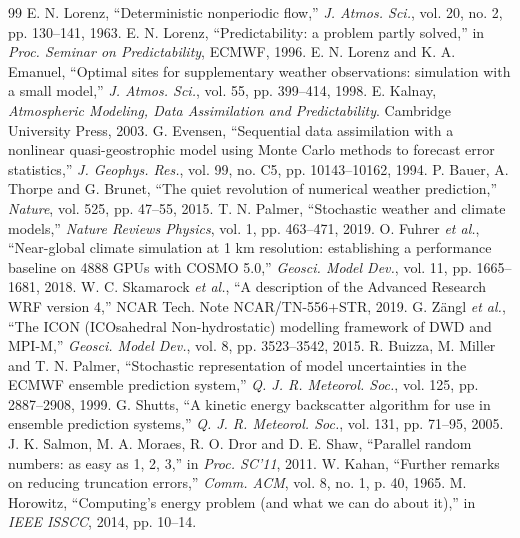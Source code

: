 \renewcommand{\refname}{References}
\begin{thebibliography}{99}\small
{} E. N. Lorenz, ``Deterministic nonperiodic flow,'' \emph{J. Atmos. Sci.}, vol. 20, no. 2, pp. 130--141, 1963.
 E. N. Lorenz, ``Predictability: a problem partly solved,'' in \emph{Proc. Seminar on Predictability}, ECMWF, 1996.
 E. N. Lorenz and K. A. Emanuel, ``Optimal sites for supplementary weather observations: simulation with a small model,'' \emph{J. Atmos. Sci.}, vol. 55, pp. 399--414, 1998.
 E. Kalnay, \emph{Atmospheric Modeling, Data Assimilation and Predictability}. Cambridge University Press, 2003.
 G. Evensen, ``Sequential data assimilation with a nonlinear quasi-geostrophic model using Monte Carlo methods to forecast error statistics,'' \emph{J. Geophys. Res.}, vol. 99, no. C5, pp. 10143--10162, 1994.
 P. Bauer, A. Thorpe and G. Brunet, ``The quiet revolution of numerical weather prediction,'' \emph{Nature}, vol. 525, pp. 47--55, 2015.
 T. N. Palmer, ``Stochastic weather and climate models,'' \emph{Nature Reviews Physics}, vol. 1, pp. 463--471, 2019.
 O. Fuhrer \emph{et al.}, ``Near-global climate simulation at 1 km resolution: establishing a performance baseline on 4888 GPUs with COSMO 5.0,'' \emph{Geosci. Model Dev.}, vol. 11, pp. 1665--1681, 2018.
 W. C. Skamarock \emph{et al.}, ``A description of the Advanced Research WRF version 4,'' NCAR Tech. Note NCAR/TN-556+STR, 2019.
 G. Z\"angl \emph{et al.}, ``The ICON (ICOsahedral Non-hydrostatic) modelling framework of DWD and MPI-M,'' \emph{Geosci. Model Dev.}, vol. 8, pp. 3523--3542, 2015.
 R. Buizza, M. Miller and T. N. Palmer, ``Stochastic representation of model uncertainties in the ECMWF ensemble prediction system,'' \emph{Q. J. R. Meteorol. Soc.}, vol. 125, pp. 2887--2908, 1999.
 G. Shutts, ``A kinetic energy backscatter algorithm for use in ensemble prediction systems,'' \emph{Q. J. R. Meteorol. Soc.}, vol. 131, pp. 71--95, 2005.
 J. K. Salmon, M. A. Moraes, R. O. Dror and D. E. Shaw, ``Parallel random numbers: as easy as 1, 2, 3,'' in \emph{Proc. SC'11}, 2011.
 W. Kahan, ``Further remarks on reducing truncation errors,'' \emph{Comm. ACM}, vol. 8, no. 1, p. 40, 1965.
 M. Horowitz, ``Computing's energy problem (and what we can do about it),'' in \emph{IEEE ISSCC}, 2014, pp. 10--14.

\end{thebibliography}

